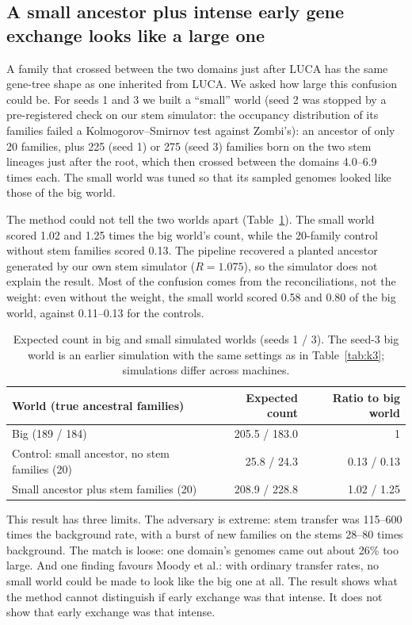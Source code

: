 \documentclass[11pt]{article}
\begin{document}
\subsection{A small ancestor plus intense early gene exchange looks like a large one}\label{sec:stem}
A family that crossed between the two domains just after LUCA has the same gene-tree shape as one inherited from LUCA. We asked how large this confusion could be. For seeds 1 and 3 we built a ``small'' world (seed 2 was stopped by a pre-registered check on our stem simulator: the occupancy distribution of its families failed a Kolmogorov--Smirnov test against Zombi's): an ancestor of only 20 families, plus 225 (seed 1) or 275 (seed 3) families born on the two stem lineages just after the root, which then crossed between the domains 4.0--6.9 times each. The small world was tuned so that its sampled genomes looked like those of the big world.

The method could not tell the two worlds apart (Table~\ref{tab:k5}). The small world scored 1.02 and 1.25 times the big world's count, while the 20-family control without stem families scored 0.13. The pipeline recovered a planted ancestor generated by our own stem simulator ($R = 1.075$), so the simulator does not explain the result. Most of the confusion comes from the reconciliations, not the weight: even without the weight, the small world scored 0.58 and 0.80 of the big world, against 0.11--0.13 for the controls.

\begin{table}[ht]
\centering
\caption{Expected count in big and small simulated worlds (seeds 1 / 3). The seed-3 big world is an earlier simulation with the same settings as in Table~\ref{tab:k3}; simulations differ across machines.}
\label{tab:k5}
\begin{tabular}{lrr}
\toprule
World (true ancestral families) & Expected count & Ratio to big world \\
\midrule
Big (189 / 184) & 205.5 / 183.0 & 1 \\
Control: small ancestor, no stem families (20) & 25.8 / 24.3 & 0.13 / 0.13 \\
Small ancestor plus stem families (20) & 208.9 / 228.8 & 1.02 / 1.25 \\
\bottomrule
\end{tabular}
\end{table}

This result has three limits. The adversary is extreme: stem transfer was 115--600 times the background rate, with a burst of new families on the stems 28--80 times background. The match is loose: one domain's genomes came out about 26\% too large. And one finding favours Moody et al.: with ordinary transfer rates, no small world could be made to look like the big one at all. The result shows what the method cannot distinguish if early exchange was that intense. It does not show that early exchange was that intense.
\end{document}
